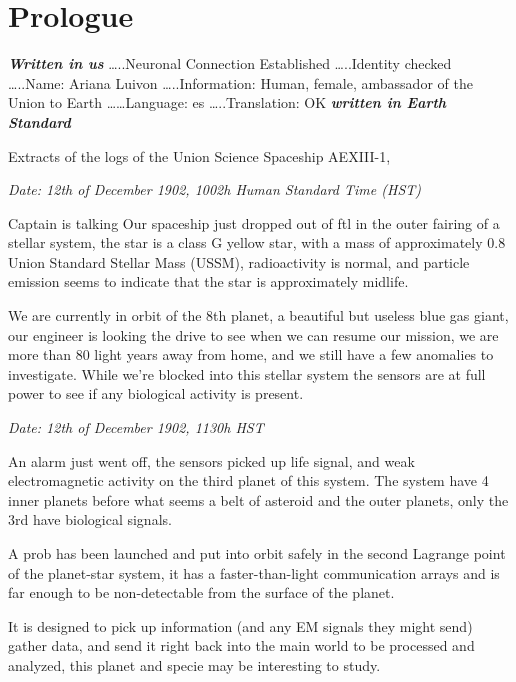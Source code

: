 \documentclass[hidelinks,12pt,a4paper]{book}
\begin{document}
    \chapter*{Prologue}
    \textit{\textbf{Written in \gls{us}}}\newline
    …..Neuronal Connection Established\newline
    …..Identity checked\newline
    …..Name: Ariana Luivon\newline
    …..Information: Human, female, ambassador of the Union to Earth\newline
    ……Language: \gls{es}\newline
    …..Translation: OK\newline
    \textit{\textbf{written in Earth Standard}}\par
    \bigskip

Extracts of the logs of the Union Science Spaceship AEXIII-1,\par
\textit{Date: 12th of December 1902, 1002h Human Standard Time (HST)}\newline

Captain is talking\newline
Our spaceship just dropped out of \gls{ftl} in the outer fairing of a stellar system, 
the star is a class G yellow star, with a mass of approximately 0.8 Union Standard Stellar Mass (USSM), 
radioactivity is normal, and particle emission seems to indicate that the star is approximately midlife.\par
\bigskip
We are currently in orbit of the 8th planet, 
a beautiful but useless blue gas giant, 
our engineer is looking the drive to see when we can resume our mission, 
we are more than 80 light years away from home, and we still have a few anomalies to investigate. 
While we're blocked into this stellar system the sensors are at full power to see if any biological activity is present.\newline

\textit{Date: 12th of December 1902, 1130h HST}\par

An alarm just went off, 
the sensors picked up life signal, and weak electromagnetic activity on the third planet of this system. 
The system have 4 inner planets before what seems a belt of asteroid and the outer planets, 
only the 3rd have biological signals. \par
\bigskip

A prob has been launched and put into orbit safely in the second Lagrange point of the planet-star system,
 it has a faster-than-light communication arrays and is far enough to be non-detectable from the surface of the planet. \par
\bigskip
It is designed to pick up information 
(and any EM signals they might send) gather data, and send it right back into the main world to be processed and analyzed, 
this planet and specie may be interesting to study.\par
\bigskip
\end{document}
